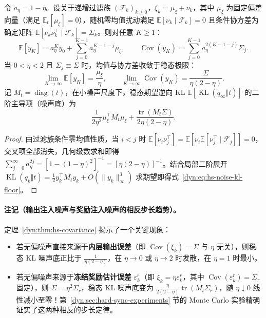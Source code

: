\documentclass[lang=cn,scheme=chinese,openany]{elegantbook}
\newcommand{\E}{\mathbb E}
\newcommand{\KL}{\operatorname{KL}}
\begin{document}
\begin{theorem}
\label{dyn:thm:hs-covariance}
令 $a_\eta=1-\eta$。设关于递增过滤族 $(\mathcal F_k)_{k\ge 0}$，$\xi_k=\mu_\xi+\nu_k$，其中 $\mu_\xi$ 为固定偏差向量（满足 $\E_t[\mu_\xi]=0$），随机零均值扰动满足 $\E[\nu_k\mid\mathcal F_k]=0$ 且条件协方差为确定矩阵 $\E[\nu_k\nu_k^\top\mid\mathcal F_k]=\Sigma_k$。则对任意 $K\ge 1$：
\begin{equation*}
 \E[y_K]=a_\eta^K y_0+\sum_{j=0}^{K-1}a_\eta^{K-1-j}\mu_\xi,\qquad
 \operatorname{Cov}(y_K)=\sum_{j=0}^{K-1}a_\eta^{2(K-1-j)}\Sigma_j.
\end{equation*}
当 $0<\eta<2$ 且 $\Sigma_j\equiv\Sigma$ 时，均值与协方差收敛于稳态极限：
\begin{equation}\label{dyn:eq:hs-stationary-cov}
 \lim_{K\to\infty}\E[y_K]=\frac{\mu_\xi}{\eta},\qquad
 \lim_{K\to\infty}\operatorname{Cov}(y_K)=\frac{\Sigma}{\eta(2-\eta)}.
\end{equation}
记 $M_t=\operatorname{diag}(t)$，在小噪声尺度下，稳态期望逆向 KL $\E[\KL(q_\infty\Vert t)]$ 的二阶主导项（噪声底）为
\begin{equation}\label{dyn:eq:hs-noise-kl-floor}
 \frac{1}{2\eta^2}\mu_\xi^\top M_t\mu_\xi
 +\frac{\operatorname{tr}(M_t\Sigma)}{2\eta(2-\eta)}.
\end{equation}
\end{theorem}
\begin{proof}
由过滤族条件零均值性质，当 $i<j$ 时 $\E[\nu_i\nu_j^\top]=\E[\nu_i\E[\nu_j^\top\mid\mathcal F_j]]=0$，交叉项全部消失，几何级数求和即得 $\sum_{j=0}^\infty a_\eta^{2j}=[1-(1-\eta)^2]^{-1}=[\eta(2-\eta)]^{-1}$。结合局部二阶展开 $\KL(q_k\Vert t)=\frac12 y_k^\top M_t y_k+O(\|y_k\|_\infty^3)$ 求期望即得式~\eqref{dyn:eq:hs-noise-kl-floor}。
\end{proof}

\paragraph{注记（输出注入噪声与奖励注入噪声的相反步长趋势）。}
定理~\ref{dyn:thm:hs-covariance} 揭示了一个关键现象：
\begin{itemize}
\item 若无偏噪声直接来源于\textbf{内层输出误差}（即 $\operatorname{Cov}(\xi_k)=\Sigma$ 与 $\eta$ 无关），则稳态 KL 噪声底正比于 $\frac{1}{\eta(2-\eta)}$，在 $\eta\to 0$ 或 $\eta\to 2$ 时发散，在 $\eta=1$ 时最小。
\item 若无偏噪声来源于\textbf{冻结奖励估计误差} $\varepsilon_k^r$（即 $\xi_k=\eta\varepsilon_k^r$，其中 $\operatorname{Cov}(\varepsilon_k^r)=\Sigma_r$ 固定），则 $\Sigma=\eta^2\Sigma_r$，稳态 KL 噪声底变为 $\frac{\eta}{2(2-\eta)}\operatorname{tr}(M_t\Sigma_r)$，随 $\eta\downarrow 0$ 线性减小至零！第~\ref{dyn:sec:hard-sync-experiments} 节的 Monte Carlo 实验精确证实了这两种相反的步长定律。
\end{itemize}
\end{document}
